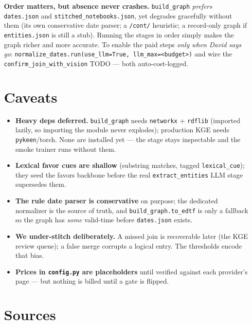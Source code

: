 \documentclass[11pt]{article}
\newcommand{\code}[1]{\texttt{\small #1}}
\begin{document}
\noindent\textbf{Order matters, but absence never crashes.} \code{build\_graph} \emph{prefers}
\code{dates.json} and \code{stitched\_notebooks.json}, yet degrades gracefully without them (its own
conservative date parser; a \code{/cont/} heuristic; a record-only graph if \code{entities.json} is
still a stub). Running the stages in order simply makes the graph richer and more accurate. To enable
the paid steps \emph{only when David says go}: \code{normalize\_dates.run(use\_llm=True,
llm\_max=<budget>)} and wire the \code{confirm\_join\_with\_vision} TODO --- both auto-cost-logged.

\section{Caveats}

\begin{itemize}[leftmargin=1.4em]
  \item \textbf{Heavy deps deferred.} \code{build\_graph} needs \code{networkx} + \code{rdflib}
        (imported lazily, so importing the module never explodes); production KGE needs
        \code{pykeen}/torch. None are installed yet --- the stage stays inspectable and the smoke
        trainer runs without them.
  \item \textbf{Lexical favor cues are shallow} (substring matches, tagged \code{lexical\_cue}); they
        seed the favors backbone before the real \code{extract\_entities} LLM stage supersedes them.
  \item \textbf{The rule date parser is conservative} on purpose; the dedicated normalizer is the
        source of truth, and \code{build\_graph.to\_edtf} is only a fallback so the graph has
        \emph{some} valid-time before \code{dates.json} exists.
  \item \textbf{We under-stitch deliberately.} A missed join is recoverable later (the KGE review
        queue); a false merge corrupts a logical entry. The thresholds encode that bias.
  \item \textbf{Prices in \code{config.py} are placeholders} until verified against each provider's
        page --- but nothing is billed until a gate is flipped.
\end{itemize}

\section{Sources}
\end{document}
